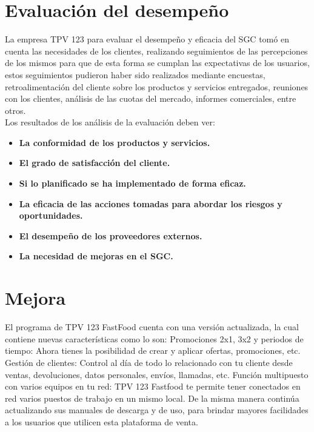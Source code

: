 \documentclass[12pt,a4paper]{article}
\begin{document}
 \par\vspace{6cm}
\section{Evaluación del desempeño}\textbf{}
La empresa TPV 123 para evaluar el desempeño y eficacia del SGC tomó en cuenta las necesidades de los clientes, realizando seguimientos de las percepciones de los mismos para que de esta forma se cumplan las expectativas de los usuarios, estos seguimientos pudieron haber sido realizados mediante encuestas, retroalimentación del cliente sobre los productos y servicios entregados, reuniones con los clientes, análisis de las cuotas del mercado, informes comerciales, entre otros.\\

Los resultados de los análisis de la evaluación deben ver:
\begin{itemize}
\item \textbf {La conformidad de los productos y servicios.}
\item \textbf {El grado de satisfacción del cliente.}
\item \textbf {Si lo planificado se ha implementado de forma eficaz.}
\item \textbf {La eficacia de las acciones tomadas para abordar los riesgos y oportunidades.}
\item \textbf {El desempeño de los proveedores externos.}
\item \textbf {La necesidad de mejoras en el SGC.}
\end{itemize}
\section{Mejora}\textbf{}
El programa de TPV 123 FastFood cuenta con una versión actualizada, la cual contiene nuevas características como lo son:
Promociones 2x1, 3x2 y periodos de tiempo: Ahora tienes la posibilidad de crear y aplicar ofertas, promociones, etc.
Gestión de clientes: Control al día de todo lo relacionado con tu cliente desde ventas, devoluciones, datos personales, envíos, llamadas, etc.
Función multipuesto con varios equipos en tu red: TPV 123 Fastfood te permite tener conectados en red varios puestos de trabajo en un mismo local.
De la misma manera continúa actualizando sus manuales de descarga y de uso, para brindar mayores facilidades a los usuarios que utilicen esta plataforma de venta.
\end{document}
